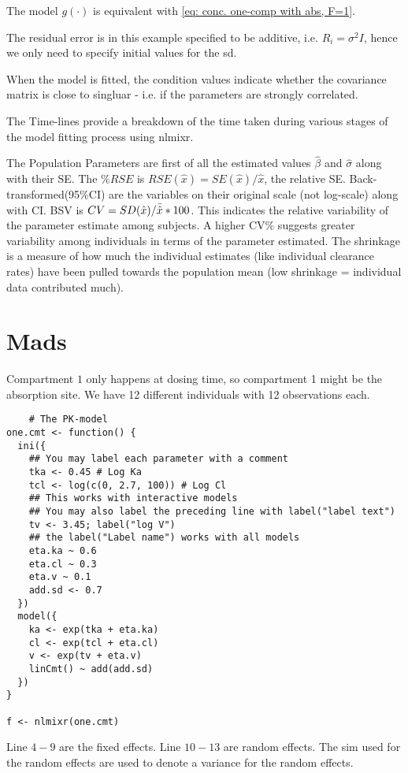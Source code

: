 The model $g(\cdot)$ is equivalent with \eqref{eq: conc. one-comp with abs, F=1}.

The residual error is in this example specified to be additive, i.e. $R_i = \sigma^2I$, hence we only need to specify initial values for the sd.

When the model is fitted, the condition values indicate whether the covariance matrix is close to singluar - i.e. if the parameters are strongly correlated.

The Time-lines provide a breakdown of the time taken during various stages of the model fitting process using nlmixr.

The Population Parameters are first of all the estimated values $\hat{\beta}$ and $\hat{\sigma}$ along with their SE. The $\%RSE$ is $RSE(\hat{x})=SE(\hat{x})/\hat{x}$, the relative SE. Back-transformed(95\%CI) are the variables on their original scale (not log-scale) along with CI. BSV is $CV=SD(\hat{x})/\Bar{\hat{x}}*100$. This indicates the relative variability of the parameter estimate among subjects. A higher CV\% suggests greater variability among individuals in terms of the parameter estimated. The shrinkage is a measure of how much the individual estimates (like individual clearance rates) have been pulled towards the population mean (low shrinkage = individual data contributed much).

\section{Mads}

Compartment $1$ only happens at dosing time, so compartment 1 might be the absorption site. We have 12 different individuals with 12 observations each. 

\begin{lstlisting}
    # The PK-model
one.cmt <- function() {
  ini({
    ## You may label each parameter with a comment
    tka <- 0.45 # Log Ka
    tcl <- log(c(0, 2.7, 100)) # Log Cl
    ## This works with interactive models
    ## You may also label the preceding line with label("label text")
    tv <- 3.45; label("log V")
    ## the label("Label name") works with all models
    eta.ka ~ 0.6
    eta.cl ~ 0.3
    eta.v ~ 0.1
    add.sd <- 0.7
  })
  model({
    ka <- exp(tka + eta.ka)
    cl <- exp(tcl + eta.cl)
    v <- exp(tv + eta.v)
    linCmt() ~ add(add.sd)
  })
}

f <- nlmixr(one.cmt)
\end{lstlisting}

Line $4-9$ are the fixed effects. Line $10-13$ are random effects. The sim used for the random effects are used to denote a variance for the random effects. 

